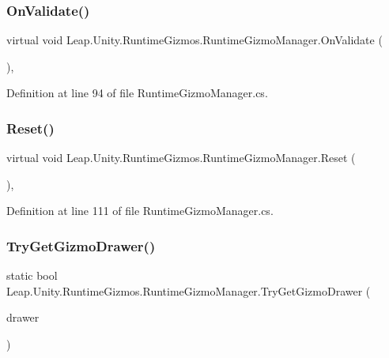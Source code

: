 \subsubsection{\texorpdfstring{OnValidate()}{OnValidate()}}
{\footnotesize\ttfamily virtual void Leap.\+Unity.\+Runtime\+Gizmos.\+Runtime\+Gizmo\+Manager.\+On\+Validate (\begin{DoxyParamCaption}{ }\end{DoxyParamCaption})\hspace{0.3cm}{\ttfamily [protected]}, {\ttfamily [virtual]}}



Definition at line 94 of file Runtime\+Gizmo\+Manager.\+cs.

\mbox{\label{class_leap_1_1_unity_1_1_runtime_gizmos_1_1_runtime_gizmo_manager_a970144ca56c74a639e83eea587cc9429}} 
\subsubsection{\texorpdfstring{Reset()}{Reset()}}
{\footnotesize\ttfamily virtual void Leap.\+Unity.\+Runtime\+Gizmos.\+Runtime\+Gizmo\+Manager.\+Reset (\begin{DoxyParamCaption}{ }\end{DoxyParamCaption})\hspace{0.3cm}{\ttfamily [protected]}, {\ttfamily [virtual]}}



Definition at line 111 of file Runtime\+Gizmo\+Manager.\+cs.

\mbox{\label{class_leap_1_1_unity_1_1_runtime_gizmos_1_1_runtime_gizmo_manager_a01d7d6c28b7ce9f019f8e2f8f55fa644}} 
\subsubsection{\texorpdfstring{TryGetGizmoDrawer()}{TryGetGizmoDrawer()}\hspace{0.1cm}{\footnotesize\ttfamily [1/2]}}
{\footnotesize\ttfamily static bool Leap.\+Unity.\+Runtime\+Gizmos.\+Runtime\+Gizmo\+Manager.\+Try\+Get\+Gizmo\+Drawer (\begin{DoxyParamCaption}\item[{out \mbox{\hyperlink{class_leap_1_1_unity_1_1_runtime_gizmos_1_1_runtime_gizmo_drawer}{Runtime\+Gizmo\+Drawer}}}]{drawer }\end{DoxyParamCaption})\hspace{0.3cm}{\ttfamily [static]}}



